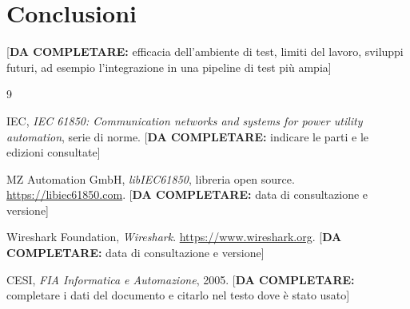\documentclass[11pt,a4paper,italian,oneside,openany]{book}
\newcommand{\daf}[1]{{\color{red}[\textbf{DA COMPLETARE:} #1]}}
\begin{document}
\chapter{Conclusioni}\label{cap:conclusioni}
\daf{efficacia dell'ambiente di test, limiti del lavoro, sviluppi futuri, ad esempio l'integrazione in una pipeline di test più ampia}

\begin{thebibliography}{9}

IEC, \textit{IEC 61850: Communication networks and systems for power utility automation}, serie di norme. \daf{indicare le parti e le edizioni consultate}

MZ Automation GmbH, \textit{libIEC61850}, libreria open source. \url{https://libiec61850.com}. \daf{data di consultazione e versione}

Wireshark Foundation, \textit{Wireshark}. \url{https://www.wireshark.org}. \daf{data di consultazione e versione}

CESI, \textit{FIA Informatica e Automazione}, 2005. \daf{completare i dati del documento e citarlo nel testo dove è stato usato}

\end{thebibliography}
\nocite{cesi}
\end{document}

